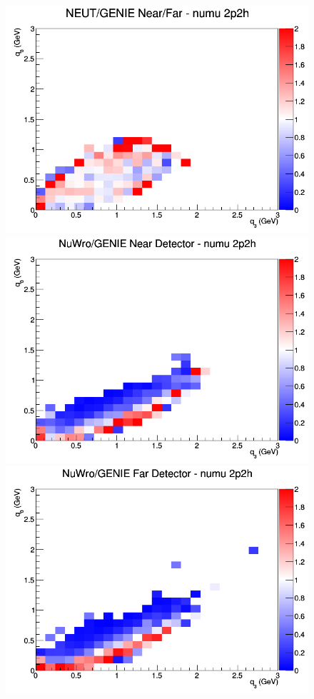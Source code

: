 \documentclass[12pt]{article}
\begin{document}
\begin{figure}[h]
\endminipage
{}
\includegraphics[width=\linewidth]{eff_q0_q3/FGT/ratios/2p2h_NEUT_GENIE_numu_NF_q3_q0.png}
\endminipage
\newline
{}
\includegraphics[width=\linewidth]{eff_q0_q3/FGT/ratios/2p2h_NuWro_GENIE_numu_near_q3_q0.png}
\endminipage
{}
\includegraphics[width=\linewidth]{eff_q0_q3/FGT/ratios/2p2h_NuWro_GENIE_numu_far_q3_q0.png}

\end{figure}
\end{document}
